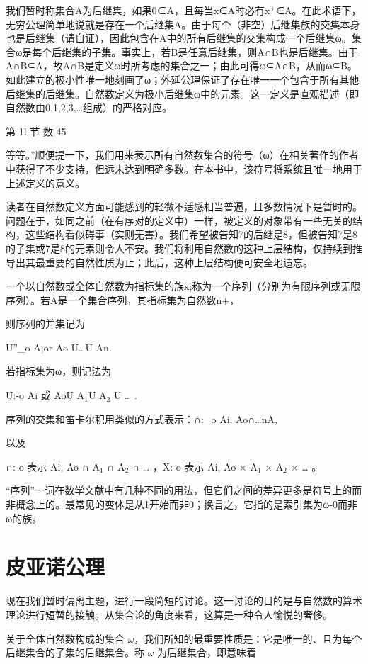 \documentclass[12pt,a4paper]{ctexbook}
\theoremstyle{definition}
\theoremstyle{remark}
\begin{document}
{我们暂时称集合A为后继集，如果0∈A，且每当x∈A时必有x$^{+}$∈A。在此术语下，无穷公理简单地说就是存在一个后继集A。由于每个（非空）后继集族的交集本身也是后继集（请自证），因此包含在A中的所有后继集的交集构成一个后继集ω。集合ω是每个后继集的子集。事实上，若B是任意后继集，则A∩B也是后继集。由于A∩B⊆A，故A∩B是定义ω时所考虑的集合之一；由此可得ω⊆A∩B，从而ω⊆B。如此建立的极小性唯一地刻画了ω；外延公理保证了存在唯一一个包含于所有其他后继集的后继集。自然数定义为极小后继集ω中的元素。这一定义是直观描述（即自然数由0,1,2,3,…组成）的严格对应。

第 1l 节 数 45

等等。”顺便提一下，我们用来表示所有自然数集合的符号（ω）在相关著作的作者中获得了不少支持，但远未达到明确多数。在本书中，该符号将系统且唯一地用于上述定义的意义。

读者在自然数定义方面可能感到的轻微不适感相当普遍，且多数情况下是暂时的。问题在于，如同之前（在有序对的定义中）一样，被定义的对象带有一些无关的结构，这些结构看似碍事（实则无害）。我们希望被告知7的后继是8，但被告知7是8的子集或7是8的元素则令人不安。我们将利用自然数的这种上层结构，仅持续到推导出其最重要的自然性质为止；此后，这种上层结构便可安全地遗忘。

一个以自然数或全体自然数为指标集的族{x;}称为一个序列（分别为有限序列或无限序列）。若{A}是一个集合序列，其指标集为自然数n+，

则序列的并集记为

U”\_o A;or Ao U…U An.

若指标集为ω，则记法为

U:-o Ai 或 AoU A$_{1}$U A$_{2}$ U … .

序列的交集和笛卡尔积用类似的方式表示：∩:\_o Ai, Ao∩…nA,

以及

∩:-o 表示 Ai, Ao ∩ A$_{1}$ ∩ A$_{2}$ ∩ … ，X:-o 表示 Ai, Ao × A$_{1}$ × A$_{2}$ × … 。

“序列”一词在数学文献中有几种不同的用法，但它们之间的差异更多是符号上的而非概念上的。最常见的变体是从1开始而非0；换言之，它指的是索引集为ω-{0}而非ω的族。


\chapter{皮亚诺公理}

现在我们暂时偏离主题，进行一段简短的讨论。这一讨论的目的是与自然数的算术理论进行短暂的接触。从集合论的角度来看，这算是一种令人愉悦的奢侈。

关于全体自然数构成的集合 \( \omega \)，我们所知的最重要性质是：它是唯一的、且为每个后继集合的子集的后继集合。称 \( \omega \) 为后继集合，即意味着

}
\end{document}
